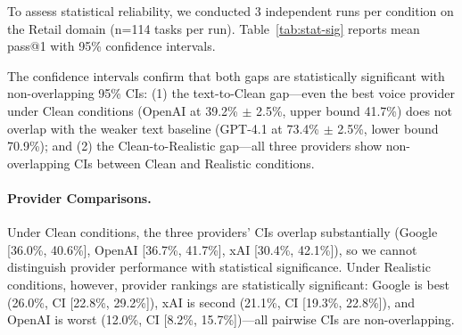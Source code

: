 To assess statistical reliability, we conducted 3 independent runs per condition on the Retail domain (n=114 tasks per run). Table~\ref{tab:stat-sig} reports mean pass@1 with 95\% confidence intervals.

\begin{table}[h]
\caption{Statistical reliability analysis for Retail domain (3 runs, n=114 tasks each). All reported values are mean $\pm$ 95\% CI.}
\label{tab:stat-sig}
\centering
\begin{small}

\end{small}
\end{table}

The confidence intervals confirm that both gaps are statistically significant with non-overlapping 95\% CIs: (1) the text-to-Clean gap---even the best voice provider under Clean conditions (OpenAI at 39.2\% $\pm$ 2.5\%, upper bound 41.7\%) does not overlap with the weaker text baseline (GPT-4.1 at 73.4\% $\pm$ 2.5\%, lower bound 70.9\%); and (2) the Clean-to-Realistic gap---all three providers show non-overlapping CIs between Clean and Realistic conditions.

\paragraph{Provider Comparisons.} Under Clean conditions, the three providers' CIs overlap substantially (Google [36.0\%, 40.6\%], OpenAI [36.7\%, 41.7\%], xAI [30.4\%, 42.1\%]), so we cannot distinguish provider performance with statistical significance. Under Realistic conditions, however, provider rankings are statistically significant: Google is best (26.0\%, CI [22.8\%, 29.2\%]), xAI is second (21.1\%, CI [19.3\%, 22.8\%]), and OpenAI is worst (12.0\%, CI [8.2\%, 15.7\%])---all pairwise CIs are non-overlapping.
